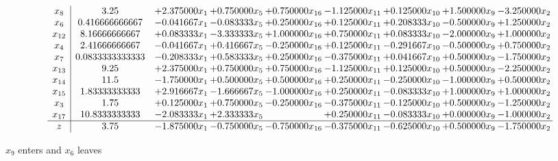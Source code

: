 \documentclass[10pt]{article}
\begin{document}
 \[\begin{array}{c| c c@{\hskip 2pt} c@{\hskip 2pt} c@{\hskip 2pt} c@{\hskip 2pt} c@{\hskip 2pt} c@{\hskip 2pt} c@{\hskip 2pt} }
 x_{8}   &  3.25 & + 2.375000 x_{1} & + 0.750000 x_{5} & + 0.750000 x_{16} & -1.125000 x_{11} & + 0.125000 x_{10} & + 1.500000 x_{9} & -3.250000 x_{2}\\
 x_{6}   &  0.416666666667 & -0.041667 x_{1} & -0.083333 x_{5} & + 0.250000 x_{16} & + 0.125000 x_{11} & + 0.208333 x_{10} & -0.500000 x_{9} & + 1.250000 x_{2}\\
 x_{12}   &  8.16666666667 & + 0.083333 x_{1} & -3.333333 x_{5} & + 1.000000 x_{16} & + 0.750000 x_{11} & + 0.083333 x_{10} & -2.000000 x_{9} & + 1.000000 x_{2}\\
 x_{4}   &  2.41666666667 & -0.041667 x_{1} & + 0.416667 x_{5} & -0.250000 x_{16} & + 0.125000 x_{11} & -0.291667 x_{10} & -0.500000 x_{9} & + 0.750000 x_{2}\\
 x_{7}   &  0.0833333333333 & -0.208333 x_{1} & + 0.583333 x_{5} & + 0.250000 x_{16} & -0.375000 x_{11} & + 0.041667 x_{10} & + 0.500000 x_{9} & -1.750000 x_{2}\\
 x_{13}   &  9.25 & + 2.375000 x_{1} & + 0.750000 x_{5} & + 0.750000 x_{16} & -1.125000 x_{11} & + 0.125000 x_{10} & + 0.500000 x_{9} & -2.250000 x_{2}\\
 x_{14}   &  11.5 & -1.750000 x_{1} & + 0.500000 x_{5} & + 0.500000 x_{16} & + 0.250000 x_{11} & -0.250000 x_{10} & -1.000000 x_{9} & + 0.500000 x_{2}\\
 x_{15}   &  1.83333333333 & + 2.916667 x_{1} & -1.666667 x_{5} & -1.000000 x_{16} & + 0.250000 x_{11} & -0.083333 x_{10} & + 1.000000 x_{9} & + 1.000000 x_{2}\\
 x_{3}   &  1.75 & + 0.125000 x_{1} & + 0.750000 x_{5} & -0.250000 x_{16} & -0.375000 x_{11} & -0.125000 x_{10} & + 0.500000 x_{9} & -1.250000 x_{2}\\
 x_{17}   &  10.8333333333 & -2.083333 x_{1} & + 2.333333 x_{5} &   & + 0.250000 x_{11} & -0.083333 x_{10} & + 0.000000 x_{9} & -1.000000 x_{2}\\
\hline
z    &  3.75 & -1.875000 x_{1} & -0.750000 x_{5} & -0.750000 x_{16} & -0.375000 x_{11} & -0.625000 x_{10} & + 0.500000 x_{9} & -1.750000 x_{2}\\
\end{array}\]


 $ x_{9} $ enters and $ x_{6} $ leaves 
\end{document}
